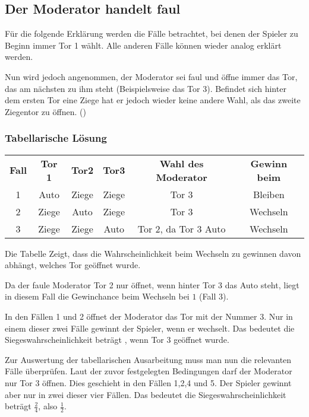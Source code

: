 
\subsection{Der Moderator handelt faul}

Für die folgende Erklärung werden die Fälle betrachtet, bei denen der Spieler zu Beginn immer Tor 1 wählt. Alle anderen Fälle können wieder analog erklärt werden.

Nun wird jedoch angenommen, der Moderator sei faul und öffne immer das Tor, das am nächsten zu ihm steht (Beispielsweise das Tor 3). Befindet sich hinter dem ersten Tor eine Ziege hat er jedoch wieder keine andere Wahl, als das zweite Ziegentor zu öffnen. (\cite{Rosenthal:2008})

\subsubsection{Tabellarische Lösung}

\begin{tabular}[h]{cccccc}
    \textbf{Fall} & \textbf{Tor 1} & \textbf{Tor2} & \textbf{Tor3} & \textbf{Wahl des Moderator} & \textbf{Gewinn beim} \\
    1             & Auto           & Ziege         & Ziege         & Tor 3                       & Bleiben              \\
    2             & Ziege          & Auto          & Ziege         & Tor 3                       & Wechseln             \\
    3             & Ziege          & Ziege         & Auto          & Tor 2, da Tor 3 Auto        & Wechseln             \\
\end{tabular}

Die Tabelle Zeigt, dass die Wahrscheinlichkeit beim Wechseln zu gewinnen davon abhängt, welches Tor geöffnet wurde.

Da der faule Moderator Tor 2 nur öffnet, wenn hinter Tor 3 das Auto steht, liegt in diesem Fall die Gewinchance beim Wechseln bei $1$ (Fall 3).

In den Fällen 1 und 2 öffnet der Moderator das Tor mit der Nummer 3. Nur in einem dieser zwei Fälle gewinnt der Spieler, wenn er wechselt. Das bedeutet die Siegeswahrscheinlichkeit beträgt , wenn Tor 3 geöffnet wurde.

Zur Auswertung der tabellarischen Ausarbeitung muss man nun die relevanten Fälle überprüfen. Laut der zuvor festgelegten Bedingungen darf der Moderator nur Tor 3 öffnen.
Dies geschieht in den Fällen 1,2,4 und 5. Der Spieler gewinnt aber nur in zwei dieser vier Fällen. Das bedeutet die Siegeswahrscheinlichkeit beträgt $\frac{2}{4}$,
also $\frac{1}{2}$.

